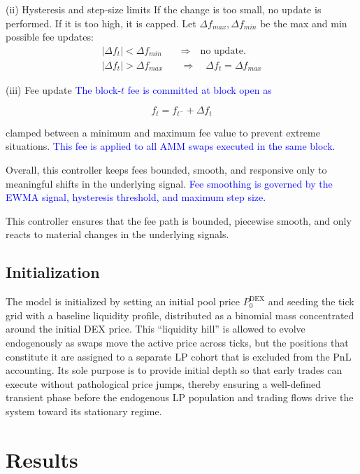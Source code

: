 \documentclass[11pt]{article}
\begin{document}
(ii) Hysteresis and step-size limits \newline
If the change is too small, no update is performed. If it is too high, it is capped. Let $\Delta f_{max}, \Delta f_{min}$ be the max and min possible fee updates:
\begin{align}
  |\Delta f_t| < \Delta f_{min} 
  \quad&\Rightarrow\quad \text{no update.} \\ 
  |\Delta f_t| > \Delta f_{max} \quad&\Rightarrow\quad \Delta f_t=\Delta f_{max}
\end{align}

(iii) Fee update \newline
\textcolor{blue}{The block-$t$ fee is committed at block open as}

\begin{equation}
    f_t = f_{t^-} + \Delta f_t
\end{equation}

clamped between a minimum and maximum fee value to prevent extreme situations. \textcolor{blue}{This fee is applied to all AMM swaps executed in the same block.}


Overall, this controller keeps fees bounded, smooth, and responsive only to meaningful shifts in the underlying signal. \textcolor{blue}{Fee smoothing is governed by the EWMA signal, hysteresis threshold, and maximum step size.}

This controller ensures that the fee path is bounded, piecewise smooth, and only reacts to material changes in the underlying signals.

\subsection{Initialization}
The model is initialized by setting an initial pool price $P^{\mathrm{DEX}}_0$ and seeding the tick grid with a baseline liquidity profile, distributed as a binomial mass concentrated around the initial DEX price. This “liquidity hill” is allowed to evolve endogenously as swaps move the active price across ticks, but the positions that constitute it are assigned to a separate LP cohort that is excluded from the PnL accounting. Its sole purpose is to provide initial depth so that early trades can execute without pathological price jumps, thereby ensuring a well-defined transient phase before the endogenous LP population and trading flows drive the system toward its stationary regime.

\section{Results}
\label{sec:results}
\end{document}
